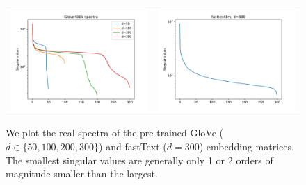 \begin{figure}
	\centering
	\begin{tabular}{c c}
		\includegraphics[width=0.4\linewidth]{figures/glove400k_spectra.pdf} &	
		\includegraphics[width=0.4\linewidth]{figures/fasttext1m_spectra.pdf}
	\end{tabular}
	\caption{We plot the real spectra of the pre-trained GloVe ($d \in \{50,100,200,300\}$) and fastText ($d=300$) embedding matrices.
	The smallest singular values are generally only 1 or 2 orders of magnitude smaller than the largest.}
	\label{fig:real_spectra}
\end{figure}


